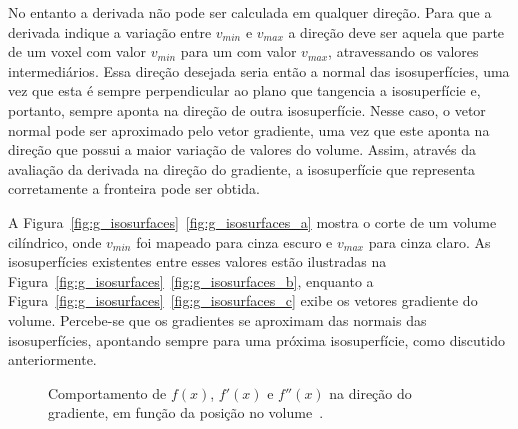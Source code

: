 	No entanto a derivada não pode ser calculada em qualquer direção. Para que a derivada indique a variação entre $v_{min}$ e $v_{max}$ a direção deve ser aquela que parte de um voxel com valor $v_{min}$ para um com valor $v_{max}$, atravessando os valores intermediários. Essa direção desejada seria então a normal das isosuperfícies, uma vez que esta é sempre perpendicular ao plano que tangencia a isosuperfície e, portanto, sempre aponta na direção de outra isosuperfície. Nesse caso, o vetor normal pode ser aproximado pelo vetor gradiente, uma vez que este aponta na direção que possui a maior variação de valores do volume. Assim, através da avaliação da derivada na direção do gradiente, a isosuperfície que representa corretamente a fronteira pode ser obtida.
	

	A Figura~\ref{fig:g_isosurfaces}~\ref{fig:g_isosurfaces_a} mostra o corte de um volume cilíndrico, onde $v_{min}$ foi mapeado para cinza escuro e $v_{max}$ para cinza claro. As isosuperfícies existentes entre esses valores estão ilustradas na Figura~\ref{fig:g_isosurfaces}~\ref{fig:g_isosurfaces_b}, enquanto a Figura~\ref{fig:g_isosurfaces}~\ref{fig:g_isosurfaces_c} exibe os vetores gradiente do volume. Percebe-se que os gradientes se aproximam das normais das isosuperfícies, apontando sempre para uma próxima isosuperfície, como discutido anteriormente.
		
\begin{figure}[h]
	\centering
	\caption{Comportamento de $f(x)$, $f'(x)$ e $f''(x)$ na direção do gradiente, em função da posição no volume~\cite{gordon}.}
	\label{fig:g_functions}
\end{figure}
	
